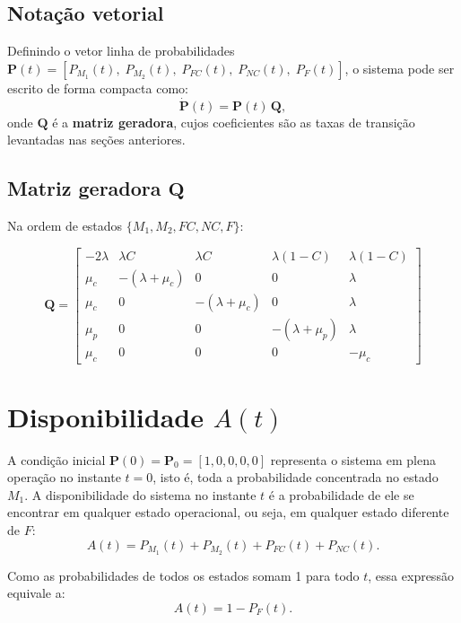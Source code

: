 \documentclass[12pt]{article}
\begin{document}
\subsection*{Notação vetorial}

Definindo o vetor linha de probabilidades
$\mathbf{P}(t) = [P_{M_1}(t),\; P_{M_2}(t),\; P_{FC}(t),\; P_{NC}(t),\; P_F(t)]$,
o sistema pode ser escrito de forma compacta como:
\[
    \dot{\mathbf{P}}(t) = \mathbf{P}(t)\,\mathbf{Q},
\]
onde $\mathbf{Q}$ é a \textbf{matriz geradora}, cujos coeficientes são as taxas de transição levantadas nas seções anteriores.

\subsection*{Matriz geradora $\mathbf{Q}$}

Na ordem de estados $\{M_1, M_2, FC, NC, F\}$:

\[
\mathbf{Q} =
\begin{bmatrix}
-2\lambda       & \lambda C          & \lambda C          & \lambda(1-C)       & \lambda(1-C) \\
\mu_c           & -(\lambda + \mu_c) & 0                  & 0                  & \lambda      \\
\mu_c           & 0                  & -(\lambda + \mu_c) & 0                  & \lambda      \\
\mu_p           & 0                  & 0                  & -(\lambda + \mu_p) & \lambda      \\
\mu_c           & 0                  & 0                  & 0                  & -\mu_c
\end{bmatrix}
\]

\newpage
\section{Disponibilidade $A(t)$}

A condição inicial $\mathbf{P}(0) = \mathbf{P}_0 = [1, 0, 0, 0, 0]$ representa o sistema em plena operação no instante $t = 0$, isto é, toda a probabilidade concentrada no estado $M_1$. A disponibilidade do sistema no instante $t$ é a probabilidade de ele se encontrar em qualquer estado operacional, ou seja, em qualquer estado diferente de $F$:
\[
    A(t) = P_{M_1}(t) + P_{M_2}(t) + P_{FC}(t) + P_{NC}(t).
\]

Como as probabilidades de todos os estados somam 1 para todo $t$, essa expressão equivale a:
\[
    \boxed{A(t) = 1 - P_F(t).}
\]
\end{document}
